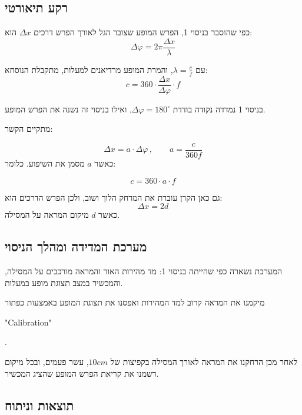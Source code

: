 \documentclass[14pt]{extarticle}
\begin{document}
\subsection*{רקע תיאורטי}
כפי שהוסבר בניסוי 1, הפרש המופע שצובר הגל לאורך הפרש דרכים $\Delta x$ הוא:
\begin{equation}
    \Delta \varphi = 2\pi \frac{\Delta x}{\lambda}
\end{equation}

עם $\lambda = \frac{c}{f}$, והמרת המופע מרדיאנים למעלות, מתקבלת הנוסחא:
\begin{equation}
    c = 360 \cdot \frac{\Delta x}{\Delta \varphi} \cdot f
\end{equation}

בניסוי 1 נמדדה נקודה בודדת $\Delta \varphi = 180^\circ$, ואילו בניסוי זה נשנה את הפרש המופע.

מתקיים הקשר:

\begin{equation}
    \Delta x = a \cdot \Delta \varphi \,, \qquad a = \frac{c}{360 f}
\end{equation}
כאשר $a$ מסמן את השיפוע. כלומר:

\begin{equation}
    c = 360 \cdot a \cdot f
\end{equation}

גם כאן הקרן עוברת את המרחק הלוך ושוב, ולכן הפרש הדרכים הוא:
\begin{equation}
    \Delta x = 2d
\end{equation}
כאשר $d$ מיקום המראה על המסילה.

\subsection*{מערכת המדידה ומהלך הניסוי}

המערכת נשארה כפי שהייתה בניסוי 1: מד מהירות האור והמראה מורכבים על המסילה, והמכשיר במצב תצוגת מופע במעלות.

מיקמנו את המראה קרוב למד המהירות ואפסנו את תצוגת המופע באמצעות כפתור \begin{english}"Calibration"\end{english}.

לאחר מכן הרחקנו את המראה לאורך המסילה בקפיצות של $10cm$, עשר פעמים, ובכל מיקום רשמנו את קריאת
הפרש המופע שהציג המכשיר.

\subsection*{תוצאות וניתוח}
\end{document}
